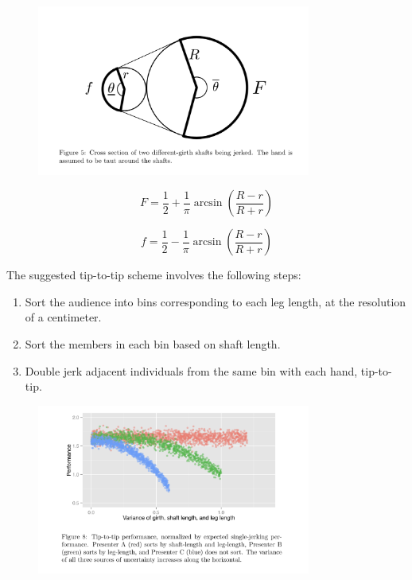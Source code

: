 \documentclass{beamer}
\begin{document}
\begin{frame}
    \begin{figure}
        \includegraphics[width=9cm]{girth}
    \end{figure}
\end{frame}

\begin{frame}

    \[
        F = \frac{1}{2} + \frac{1}{\pi}\arcsin (\frac{R - r}{R + r})
    \]

    \[
        f = \frac{1}{2} - \frac{1}{\pi}\arcsin (\frac{R - r}{R + r})
    \]

\end{frame}

\begin{frame}
The suggested tip-to-tip scheme involves the following steps:
    \begin{enumerate}
        \item Sort the audience into bins corresponding to each leg length, at the resolution of a centimeter.
        \item Sort the members in each bin based on shaft length.
        \item Double jerk adjacent individuals from the same bin with each hand, tip-to-tip.
    \end{enumerate}
\end{frame}


\begin{frame}
    \begin{figure}
        \includegraphics[width=9cm]{sorting}
    \end{figure}
\end{frame}
\end{document}
